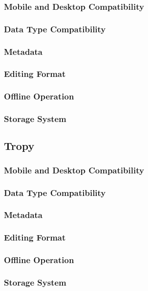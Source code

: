 \documentclass{article}
\begin{document}
\subsubsection{Mobile and Desktop Compatibility}
\subsubsection{Data Type Compatibility}
\subsubsection{Metadata}
\subsubsection{Editing Format}
\subsubsection{Offline Operation}
\subsubsection{Storage System}

\subsection{Tropy}
\subsubsection{Mobile and Desktop Compatibility}
\subsubsection{Data Type Compatibility}
\subsubsection{Metadata}
\subsubsection{Editing Format}
\subsubsection{Offline Operation}
\subsubsection{Storage System}
\end{document}
